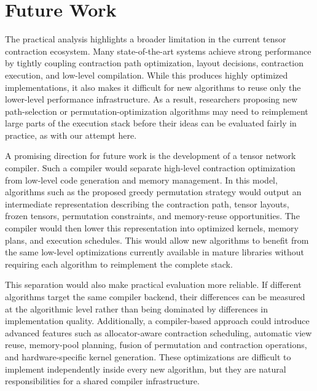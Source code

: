 
\chapter{Future Work}\label{chap:future_work}

The practical analysis highlights a broader limitation in the current tensor contraction ecosystem. Many state-of-the-art systems achieve strong performance by tightly coupling contraction path optimization, layout decisions, contraction execution, and low-level compilation. While this produces highly optimized implementations, it also makes it difficult for new algorithms to reuse only the lower-level performance infrastructure. As a result, researchers proposing new path-selection or permutation-optimization algorithms may need to reimplement large parts of the execution stack before their ideas can be evaluated fairly in practice, as with our attempt here.

A promising direction for future work is the development of a tensor network compiler. Such a compiler would separate high-level contraction optimization from low-level code generation and memory management. In this model, algorithms such as the proposed greedy permutation strategy would output an intermediate representation describing the contraction path, tensor layouts, frozen tensors, permutation constraints, and memory-reuse opportunities. The compiler would then lower this representation into optimized kernels, memory plans, and execution schedules. This would allow new algorithms to benefit from the same low-level optimizations currently available in mature libraries without requiring each algorithm to reimplement the complete stack.

This separation would also make practical evaluation more reliable. If different algorithms target the same compiler backend, their differences can be measured at the algorithmic level rather than being dominated by differences in implementation quality. Additionally, a compiler-based approach could introduce advanced features such as allocator-aware contraction scheduling, automatic view reuse, memory-pool planning, fusion of permutation and contraction operations, and hardware-specific kernel generation. These optimizations are difficult to implement independently inside every new algorithm, but they are natural responsibilities for a shared compiler infrastructure.

